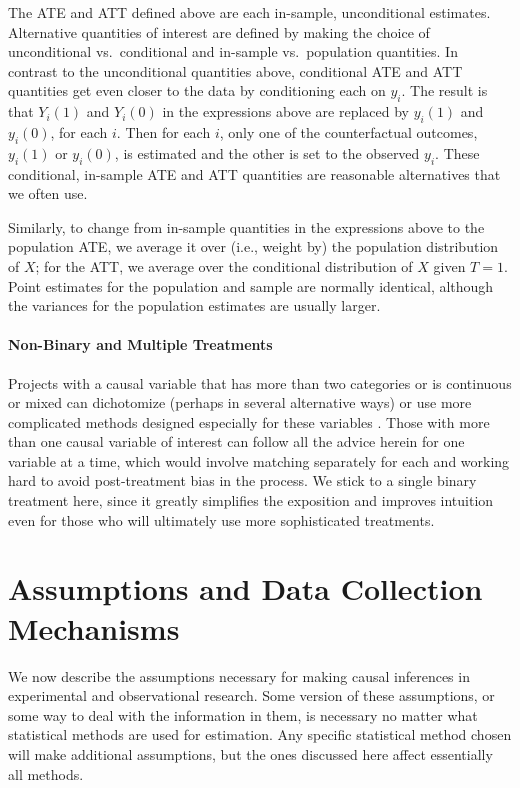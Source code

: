 \documentclass[11pt,titlepage]{article}
\begin{document}
The ATE and ATT defined above are each in-sample, unconditional
estimates.  Alternative quantities of interest are defined by making
the choice of unconditional vs.\ conditional and in-sample vs.\ 
population quantities.  In contrast to the unconditional quantities
above, conditional ATE and ATT quantities get even closer to the data
by conditioning each on $y_i$.  The result is that $Y_i(1)$ and
$Y_i(0)$ in the expressions above are replaced by $y_i(1)$ and
$y_i(0)$, for each $i$.  Then for each $i$, only one of the
counterfactual outcomes, $y_i(1)$ or $y_i(0)$, is estimated and the
other is set to the observed $y_i$.  These conditional, in-sample ATE
and ATT quantities are reasonable alternatives that we often use.

Similarly, to change from in-sample quantities in the expressions
above to the population ATE, we average it over (i.e., weight by) the
population distribution of $X$; for the ATT, we average over the
conditional distribution of $X$ given $T=1$.  Point estimates for the
population and sample are normally identical, although the variances
for the population estimates are usually larger.

\paragraph{Non-Binary and Multiple Treatments}

Projects with a causal variable that has more than two categories or
is continuous or mixed can dichotomize (perhaps in several
alternative ways) or use more complicated methods designed especially
for these variables \citep{ImaDyk04}.  Those with more than one causal
variable of interest can follow all the advice herein for one variable
at a time, which would involve matching separately for each and
working hard to avoid post-treatment bias in the process.  We stick to
a single binary treatment here, since it greatly simplifies the
exposition and improves intuition even for those who will ultimately
use more sophisticated treatments.

\section{Assumptions and Data Collection Mechanisms}

We now describe the assumptions necessary for making causal inferences
in experimental and observational research.  Some version of these
assumptions, or some way to deal with the information in them, is
necessary no matter what statistical methods are used for estimation.
Any specific statistical method chosen will make additional
assumptions, but the ones discussed here affect essentially all
methods.
\end{document}
